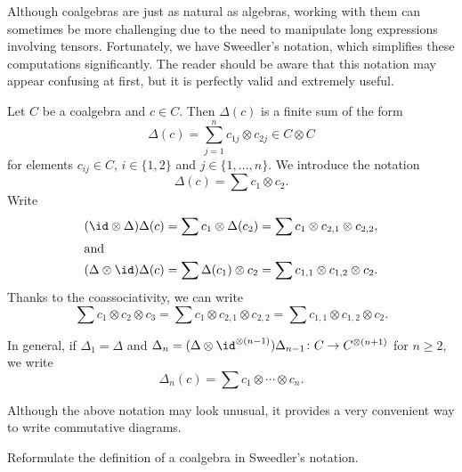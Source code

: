 \documentclass[12pt]{amsproc}
\begin{document}
Although coalgebras are just as natural as algebras, working with them can sometimes be more challenging due to the need to manipulate long expressions involving tensors. Fortunately, we have Sweedler's notation, which simplifies these computations significantly. The reader should be aware that this notation may appear confusing at first, but it is perfectly valid and extremely useful.

Let $C$ be a coalgebra and $c\in C$. Then $\Delta(c)$ is
a finite sum of the form 
\[
\Delta(c)=\sum_{j=1}^n c_{1j}\otimes c_{2j}\in C\otimes C
\]
for elements $c_{ij}\in C$, $i\in\{1,2\}$ 
and $j\in\{1,\dots,n\}$. We introduce the notation 
\[
\Delta(c)=\sum c_{1}\otimes c_{2}.
\]
Write 
\begin{align*}
(\id\otimes\Delta)\Delta(c)&=\sum c_1\otimes\Delta(c_2)=\sum c_1\otimes c_{2,1}\otimes c_{2,2},\\
\shortintertext{and}
(\Delta\otimes\id)\Delta(c)&=\sum\Delta(c_1)\otimes c_2
    =\sum c_{1,1}\otimes c_{1,2}\otimes c_{2}. 
\end{align*}
Thanks to the coassociativity, we can write 
\[
\sum c_{1}\otimes c_{2}\otimes c_{3}
=\sum c_1\otimes c_{2,1}\otimes c_{2,2}
=\sum c_{1,1}\otimes c_{1,2}\otimes c_{2}.
\]

In general, if $\Delta_1=\Delta$ and 
$\Delta_n=(\Delta\otimes\id^{\otimes(n-1)})\Delta_{n-1}\colon C\to C^{\otimes(n+1)}$ for $n\geq2$, 
we write 
\[
\Delta_n(c)=\sum c_{1}\otimes\cdots\otimes c_{n}.
\]

Although the above notation may look unusual, it provides a very convenient way to write commutative diagrams. 

\begin{exercise}
\label{xca:Hopf}
    Reformulate the definition of a coalgebra in Sweedler’s notation.
\end{exercise}
\end{document}

